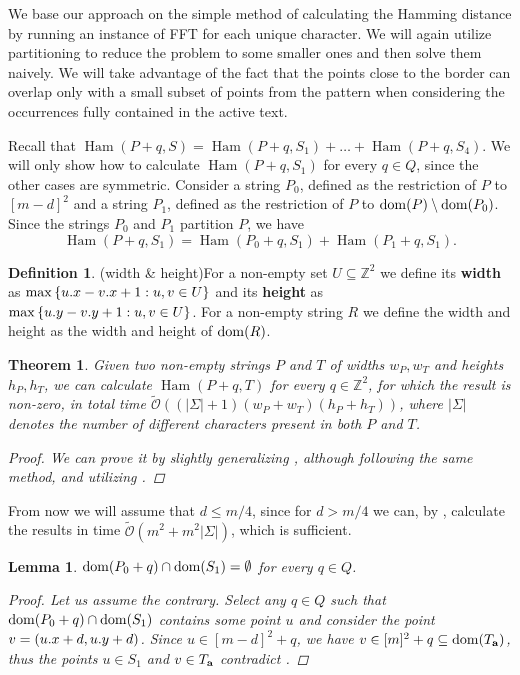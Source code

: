 \documentclass[11pt]{article}
\newcommand{\Z}{\mathbb{Z}}
\newcommand{\tO}{\tilde{\mathcal{O}}}
\newcommand{\set}[1]{\left\lbrace #1 \right\rbrace}
\theoremstyle{plain}
\newtheorem{theorem}{Theorem}
\newtheorem{lemma}{Lemma}
\theoremstyle{definition}
\newtheorem{definition}{Definition}
\theoremstyle{remark}
\DeclareMathOperator*{\Ham}{Ham}
\begin{document}
\SigmaBorder

We base our approach on the simple method of calculating the Hamming distance by running an instance of FFT for each unique character.
We will again utilize partitioning to reduce the problem to some smaller ones and then solve them naively.
We will take advantage of the fact that the points close to the border can overlap only with a small subset of points from the pattern when considering the occurrences fully contained in the active text.

Recall that 
$\Ham(P + q, S) = \Ham(P + q, S_1) + \dots + \Ham(P + q, S_4)$.
We will only show how to calculate $\Ham(P + q, S_1)$ for every $q \in Q$, since the other cases are symmetric.
Consider a string $P_0$, defined as the restriction of $P$ to $[m - d]^2$ and a string $P_1$, defined as the restriction of $P$ to $\operatorname*{dom}(P) \setminus \operatorname*{dom}(P_0)$.
Since the strings $P_0$ and $P_1$ partition $P$, we have
\[ \Ham(P + q, S_1) = \Ham(P_0 + q, S_1) + \Ham(P_1 + q, S_1).\]

\begin{definition}(width \& height)\label{width_and_height_definition}
	For a non-empty set $U \subseteq \Z^2$ we define its \textbf{width} as $\max\set{\x{u} - \x{v} + 1 : u, v \in U}$
	and its \textbf{height} as $\max\set{\y{u} - \y{v} + 1 : u, v \in U}$.
	For a non-empty string $R$ we define the width and height as the width and height of $\operatorname*{dom}(R)$.
\end{definition}

\begin{theorem}\label{general_fft}
	Given two non-empty strings $P$ and $T$ of widths $w_P, w_T$ and heights $h_P, h_T$, we can calculate $\Ham(P + q, T)$ for every $q \in \Z^2$, for which the result is non-zero, in total time $\tO((|\Sigma| + 1)(w_P + w_T)(h_P + h_T))$, where $|\Sigma|$ denotes the number of different characters present in both $P$ and $T$.
	\begin{proof}
		We can prove it by slightly generalizing , although following the same method, and utilizing .
	\end{proof}
\end{theorem}

From now we will assume that $d \le m / 4$, since for $d > m / 4$ we can, by , calculate the results in time $\tO(m^2 + m^2|\Sigma|)$, which is sufficient.


\begin{lemma}\label{border_hamming_reduction}
	$\operatorname*{dom}(P_0 + q) \cap \operatorname*{dom}(S_1) = \emptyset$ for every $q \in Q$.
	\begin{proof}
		Let us assume the contrary.
		Select any $q \in Q$ such that $\operatorname*{dom}(P_0 + q) \cap \operatorname*{dom}(S_1)$ 
		contains some point $u$ and consider the point $v = (u.x + d, u.y + d)$.
		Since $u \in [m - d]^2 + q$, we have $v \in [m]^2 + q \subseteq \operatorname*{dom}(T_\mathbf{a})$, thus the points $u \in S_1$ and $v \in T_\mathbf{a}$ contradict .
	\end{proof}
\end{lemma}
\end{document}
